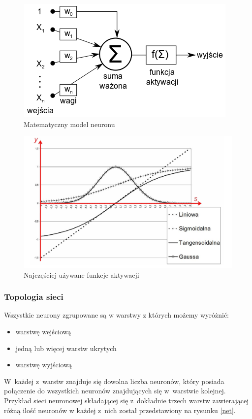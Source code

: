 \begin{figure}[ht!]
\centering
\includegraphics{res/neuron.png}
\caption[Caption for LOF]{Matematyczny model neuronu\label{neuron}\footnotemark}
\end{figure} 


\begin{figure}[ht!]
\centering
\includegraphics[scale=0.45]{res/funkcje.png}
\caption{Najczęściej używane funkcje aktywacji\cite{leksykon}\label{funkcje}}
\end{figure} 

\subsubsection{Topologia sieci}
\begin{minipage}[adjusting]{\textwidth}
Wszystkie neurony zgrupowane są w warstwy z których możemy wyróżnić:
\begin{itemize}
\item warstwę wejściową
\item jedną lub więcej warstw ukrytych
\item warstwę wyjściową
\end{itemize}
\end{minipage}\vspace{1cm}
W~każdej z~warstw znajduje się dowolna liczba neuronów, który posiada połączenie do wszystkich neuronów znajdujących się w~warstwie kolejnej. Przykład sieci neuronowej składającej się z~dokładnie trzech warstw zawierającej różną ilość neuronów w każdej z~nich został przedstawiony na rysunku \ref{net}.

